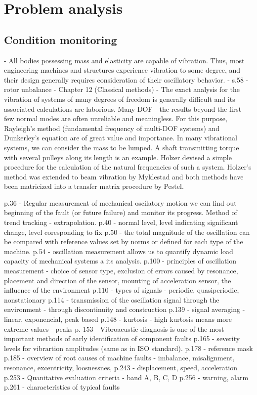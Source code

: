 \chapter{Problem analysis}


\section{Condition monitoring}
\cite{thomson_theory_1993}
- All bodies possessing mass and elasticity are capable of vibration. Thus, most engineering machines and structures experience vibration to some degree, and their design generally requires consideration of their oscillatory behavior. 
- s.58 - rotor unbalance 
- Chapter 12 (Classical methods) - The exact analysis for the vibration of systems of many degrees of freedom is generally difficult and its associated calculations are laborious. Many DOF - the results beyond the first few normal modes are often unreliable and meaningless. 
For this purpose, Rayleigh's method (fundamental frequency of multi-DOF systems) and Dunkerley's equation are of great value and importance. In many vibrational systems, we can consider the mass to be lumped. A shaft transmitting torque with several pulleys along its length is an example. Holzer devised a simple procedure for the calculation of the natural frequencies of such a system. Holzer's method was extended to beam vibration by Myklestad and both methods have been matricized into a transfer matrix procedure by Pestel.

\cite{ziaran_technicka_2013}
p.36 - Regular measurement of mechanical oscilatory motion we can find out beginning of the fault (or future failure) and monitor its progress. Method of trend tracking - extrapolation.
p.40 - normal level, level indicating significant change, level coresponding to fix
p.50 - the total magnitude of the oscillation can be compared with reference values set by norms or defined for each type of the machine.
p.54 - oscillation measurement allows us to quantify dynamic load capacity of mechanical systems a its analysis.
p.100 - principles of oscillation measurement - choice of sensor type, exclusion of errors caused by resonance, placement and direction of the sensor, mounting of acceleration sensor, the influence of the environment
p.110 - types of signals - periodic, quasiperiodic, nonstationary
p.114 - transmission of the oscillation signal through the environment - through discontinuity and construction
p.139 - signal averaging - linear, exponencial, peak based
p.148 - kurtosis - high kurtosis means more extreme values - peaks 
p. 153 - Vibroacustic diagnosis is one of the most important methods of early identification of component faults
p.165 - severity levels for vibrartion amplitudes (same as in ISO standard). 
p.178 - reference mask
p.185 - overview of root causes of machine faults - imbalance, misalignment,  resonance, excentricity, loosnessnes, 
p.243 - displacement, speed, acceleration
p.253 - Quanitative evaluation criteria - band A, B, C, D
p.256 - warning, alarm
p.261 - characteristics of typical faults

